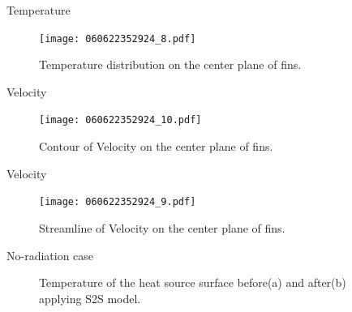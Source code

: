 \documentclass[10pt, xcolor=table]{beamer}
\begin{document}
\begin{frame}{Temperature}
	\begin{figure}
		\texttt{[image: 060622352924\_8.pdf]}
		\caption{Temperature distribution on the center plane of fins.}
	\end{figure}
\end{frame}
\begin{frame}{Velocity}
	\begin{figure}
		\texttt{[image: 060622352924\_10.pdf]}
		\caption{Contour of Velocity on the center plane of fins.}
	\end{figure}	
\end{frame}
\begin{frame}{Velocity}
	\begin{figure}
		\texttt{[image: 060622352924\_9.pdf]}
		\caption{Streamline of Velocity on the center plane of fins.}
	\end{figure}	
\end{frame}
\begin{frame}{No-radiation case}
	\begin{figure}[htbp]
		\centering
	   \caption{Temperature of the heat source surface before(a) and after(b) applying S2S model.}
	   \label{fig:14}
	   \end{figure}
\end{frame}
\end{document}
